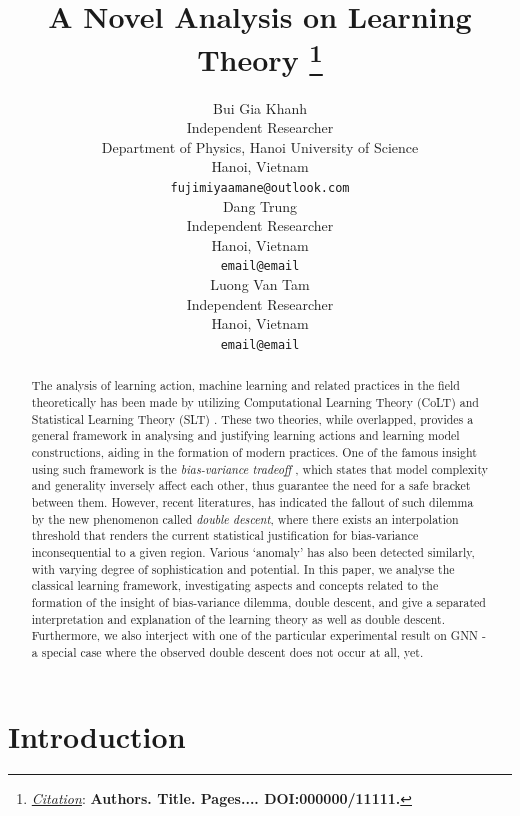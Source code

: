 \documentclass{article}
\title{A Novel Analysis on Learning Theory
\thanks{\textit{\underline{Citation}}: 
\textbf{Authors. Title. Pages.... DOI:000000/11111.}} 
}
\author{
  Bui Gia Khanh\\
  Independent Researcher \\
  Department of Physics, Hanoi University of Science \\
  Hanoi, Vietnam\\
  \texttt{fujimiyaamane@outlook.com} \\
   \AND
  Dang Trung \\
  Independent Researcher \\
  Hanoi, Vietnam\\
  \texttt{email@email} \\
  \And 
  Luong Van Tam  \\
  Independent Researcher \\
  Hanoi, Vietnam \\
  \texttt{email@email} 
}
\begin{document}
\maketitle

\begin{abstract}
    The analysis of learning action, machine learning and related practices in the field theoretically has been made by utilizing Computational Learning Theory (CoLT) \cite{10.1145/1968.1972} and Statistical Learning Theory (SLT) \cite{Vapnik1999-VAPTNO}. These two theories, while overlapped, provides a general framework in analysing and justifying learning actions and learning model constructions, aiding in the formation of modern practices. One of the famous insight using such framework is the \textit{bias-variance tradeoff} \cite{6797087}, which states that model complexity and generality inversely affect each other, thus guarantee the need for a safe bracket between them. However, recent literatures, \cite{belkin_reconciling_2019} has indicated the fallout of such dilemma by the new phenomenon called \textit{double descent}, where there exists an interpolation threshold that renders the current statistical justification for bias-variance inconsequential to a given region. Various `anomaly' has also been detected similarly, with varying degree of sophistication and potential. In this paper, we analyse the classical learning framework, investigating aspects and concepts related to the formation of the insight of bias-variance dilemma, double descent, and give a separated interpretation and explanation of the learning theory as well as double descent. Furthermore, we also interject with one of the particular experimental result on GNN - a special case where the observed double descent does not occur at all, yet.
\end{abstract}



\section{Introduction}
\end{document}
